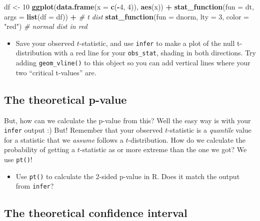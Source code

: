\documentclass[]{article}
\newenvironment{Shaded}{\begin{snugshade}}{\end{snugshade}}
\newcommand{\KeywordTok}[1]{\textcolor[rgb]{0.13,0.29,0.53}{\textbf{#1}}}
\newcommand{\DataTypeTok}[1]{\textcolor[rgb]{0.13,0.29,0.53}{#1}}
\newcommand{\DecValTok}[1]{\textcolor[rgb]{0.00,0.00,0.81}{#1}}
\newcommand{\StringTok}[1]{\textcolor[rgb]{0.31,0.60,0.02}{#1}}
\newcommand{\CommentTok}[1]{\textcolor[rgb]{0.56,0.35,0.01}{\textit{#1}}}
\newcommand{\OperatorTok}[1]{\textcolor[rgb]{0.81,0.36,0.00}{\textbf{#1}}}
\newcommand{\NormalTok}[1]{#1}
\providecommand{\tightlist}{%
  \setlength{\itemsep}{0pt}\setlength{\parskip}{0pt}}
\begin{document}
\begin{Shaded}
\begin{Highlighting}[]
\NormalTok{df <-}\StringTok{ }\DecValTok{10}
\KeywordTok{ggplot}\NormalTok{(}\KeywordTok{data.frame}\NormalTok{(}\DataTypeTok{x =} \KeywordTok{c}\NormalTok{(}\OperatorTok{-}\DecValTok{4}\NormalTok{, }\DecValTok{4}\NormalTok{)), }\KeywordTok{aes}\NormalTok{(x)) }\OperatorTok{+}\StringTok{ }
\StringTok{  }\KeywordTok{stat_function}\NormalTok{(}\DataTypeTok{fun =}\NormalTok{ dt, }\DataTypeTok{args =} \KeywordTok{list}\NormalTok{(}\DataTypeTok{df =}\NormalTok{ df)) }\OperatorTok{+}\StringTok{ }\CommentTok{# t dist}
\StringTok{  }\KeywordTok{stat_function}\NormalTok{(}\DataTypeTok{fun =}\NormalTok{ dnorm, }\DataTypeTok{lty =} \DecValTok{3}\NormalTok{, }\DataTypeTok{color =} \StringTok{"red"}\NormalTok{) }\CommentTok{# normal dist in red}
\end{Highlighting}
\end{Shaded}

\begin{itemize}
\tightlist
\item
  Save your observed \(t\)-statistic, and use \texttt{infer} to make a
  plot of the null t-distribution with a red line for your
  \texttt{obs\_stat}, shading in both directions. Try adding
  \texttt{geom\_vline()} to this object so you can add vertical lines
  where your two ``critical t-values'' are.
\end{itemize}

\subsection{The theoretical p-value}\label{the-theoretical-p-value}

But, how can we calculate the p-value from this? Well the easy way is
with your \texttt{infer} output :) But! Remember that your observed
\(t\)-statistic is a \emph{quantile} value for a statistic that we
\emph{assume} follows a \(t\)-distribution. How do we calculate the
probability of getting a \(t\)-statistic as or more extreme than the one
we got? We use \texttt{pt()}!

\begin{itemize}
\tightlist
\item
  Use \texttt{pt()} to calculate the 2-sided p-value in R. Does it match
  the output from \texttt{infer}?
\end{itemize}

\subsection{The theoretical confidence
interval}\label{the-theoretical-confidence-interval}
\end{document}
